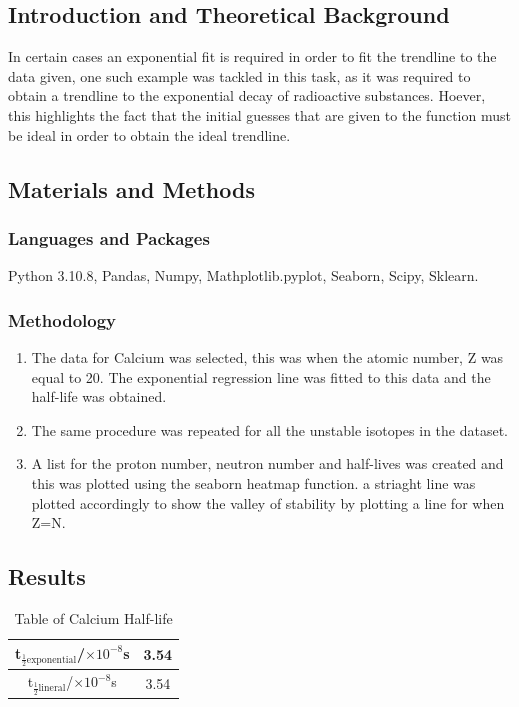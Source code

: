 \documentclass[12pt, a4paper]{article}
\begin{document}
\subsection{Introduction and Theoretical Background}
In certain cases an exponential fit is required in order to fit the trendline to the data given, one such example was tackled in this task, as it was required to obtain a trendline to the exponential decay of radioactive substances. Hoever, this highlights the fact that the initial guesses that are given to the function must be ideal in order to obtain the ideal trendline.

\subsection{Materials and Methods}
\subsubsection{Languages and Packages}
Python 3.10.8, Pandas, Numpy, Mathplotlib.pyplot, Seaborn, Scipy, Sklearn. 

\subsubsection{Methodology}
\begin{enumerate}
    \item The data for Calcium was selected, this was when the atomic number, Z was equal to 20. The exponential regression line was fitted to this data and the half-life was obtained.
    \item The same procedure was repeated for all the unstable isotopes in the dataset. 
    \item A list for the proton number, neutron number and half-lives was created and this was plotted using the seaborn heatmap function. a striaght line was plotted accordingly to show the valley of stability by plotting a line for when Z=N.
\end{enumerate}

\subsection{Results}
\begin{table}[H]
    \centering
    \begin{tabular}{|c|c|}
    \hline
    t\(_{\frac{1}{2}\mathrm{ exponential}}\)/\(\times 10^{-8}\)s & 3.54 \\ \hline
    t\(_{\frac{1}{2}\mathrm{ lineral}}\)/\(\times 10^{-8}\)s & 3.54 \\ \hline
    \end{tabular}
    \caption{Table of Calcium Half-life}
    \label{tab: Table 3.1}
\end{table}
\end{document}
